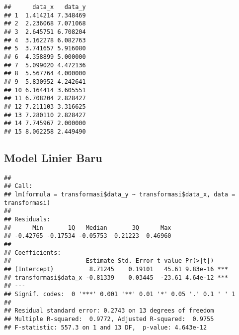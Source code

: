 \documentclass[
]{article}
\newenvironment{Shaded}{\begin{snugshade}}{\end{snugshade}}
\newcommand{\AttributeTok}[1]{\textcolor[rgb]{0.13,0.29,0.53}{#1}}
\newcommand{\FunctionTok}[1]{\textcolor[rgb]{0.13,0.29,0.53}{\textbf{#1}}}
\newcommand{\NormalTok}[1]{#1}
\newcommand{\OtherTok}[1]{\textcolor[rgb]{0.56,0.35,0.01}{#1}}
\newcommand{\SpecialCharTok}[1]{\textcolor[rgb]{0.81,0.36,0.00}{\textbf{#1}}}
\begin{document}
\begin{Shaded}
\end{Shaded}

\begin{verbatim}
##      data_x   data_y
## 1  1.414214 7.348469
## 2  2.236068 7.071068
## 3  2.645751 6.708204
## 4  3.162278 6.082763
## 5  3.741657 5.916080
## 6  4.358899 5.000000
## 7  5.099020 4.472136
## 8  5.567764 4.000000
## 9  5.830952 4.242641
## 10 6.164414 3.605551
## 11 6.708204 2.828427
## 12 7.211103 3.316625
## 13 7.280110 2.828427
## 14 7.745967 2.000000
## 15 8.062258 2.449490
\end{verbatim}

\hypertarget{model-linier-baru}{%
\subsection{Model Linier Baru}\label{model-linier-baru}}

\begin{Shaded}
\end{Shaded}

\begin{verbatim}
## 
## Call:
## lm(formula = transformasi$data_y ~ transformasi$data_x, data = transformasi)
## 
## Residuals:
##      Min       1Q   Median       3Q      Max 
## -0.42765 -0.17534 -0.05753  0.21223  0.46960 
## 
## Coefficients:
##                     Estimate Std. Error t value Pr(>|t|)    
## (Intercept)          8.71245    0.19101   45.61 9.83e-16 ***
## transformasi$data_x -0.81339    0.03445  -23.61 4.64e-12 ***
## ---
## Signif. codes:  0 '***' 0.001 '**' 0.01 '*' 0.05 '.' 0.1 ' ' 1
## 
## Residual standard error: 0.2743 on 13 degrees of freedom
## Multiple R-squared:  0.9772, Adjusted R-squared:  0.9755 
## F-statistic: 557.3 on 1 and 13 DF,  p-value: 4.643e-12
\end{verbatim}
\end{document}
